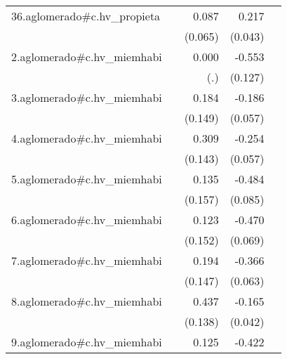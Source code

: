 {\begin{longtable}{l*{4}{D{.}{.}{-1}}}
\addlinespace
36.aglomerado#c.hv\_propieta&                     &       0.087         &       0.217\sym{***}&                     \\
            &                     &     (0.065)         &     (0.043)         &                     \\
\addlinespace
2.aglomerado#c.hv\_miemhabi&                     &       0.000         &      -0.553\sym{***}&                     \\
            &                     &         (.)         &     (0.127)         &                     \\
\addlinespace
3.aglomerado#c.hv\_miemhabi&                     &       0.184         &      -0.186\sym{**} &                     \\
            &                     &     (0.149)         &     (0.057)         &                     \\
\addlinespace
4.aglomerado#c.hv\_miemhabi&                     &       0.309\sym{*}  &      -0.254\sym{***}&                     \\
            &                     &     (0.143)         &     (0.057)         &                     \\
\addlinespace
5.aglomerado#c.hv\_miemhabi&                     &       0.135         &      -0.484\sym{***}&                     \\
            &                     &     (0.157)         &     (0.085)         &                     \\
\addlinespace
6.aglomerado#c.hv\_miemhabi&                     &       0.123         &      -0.470\sym{***}&                     \\
            &                     &     (0.152)         &     (0.069)         &                     \\
\addlinespace
7.aglomerado#c.hv\_miemhabi&                     &       0.194         &      -0.366\sym{***}&                     \\
            &                     &     (0.147)         &     (0.063)         &                     \\
\addlinespace
8.aglomerado#c.hv\_miemhabi&                     &       0.437\sym{**} &      -0.165\sym{***}&                     \\
            &                     &     (0.138)         &     (0.042)         &                     \\
\addlinespace
9.aglomerado#c.hv\_miemhabi&                     &       0.125         &      -0.422\sym{***}&                     \\

\end{longtable}}
